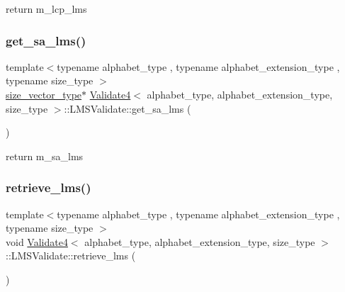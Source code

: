 return m\+\_\+lcp\+\_\+lms 

\mbox{\label{struct_validate4_1_1_l_m_s_validate_a31cdfa18f11ba39b3d9fbf08706913fc}} 
\subsubsection{\texorpdfstring{get\+\_\+sa\+\_\+lms()}{get\_sa\_lms()}}
{\footnotesize\ttfamily template$<$typename alphabet\+\_\+type , typename alphabet\+\_\+extension\+\_\+type , typename size\+\_\+type $>$ \\
\hyperlink{class_validate4_a46ea31a0a4b23f583806792160421d15}{size\+\_\+vector\+\_\+type}$\ast$ \hyperlink{class_validate4}{Validate4}$<$ alphabet\+\_\+type, alphabet\+\_\+extension\+\_\+type, size\+\_\+type $>$\+::L\+M\+S\+Validate\+::get\+\_\+sa\+\_\+lms (\begin{DoxyParamCaption}{ }\end{DoxyParamCaption})\hspace{0.3cm}{\ttfamily [inline]}}



return m\+\_\+sa\+\_\+lms 

\mbox{\label{struct_validate4_1_1_l_m_s_validate_afd7ee2100849c6c9bc493782d0c9aea3}} 
\subsubsection{\texorpdfstring{retrieve\+\_\+lms()}{retrieve\_lms()}}
{\footnotesize\ttfamily template$<$typename alphabet\+\_\+type , typename alphabet\+\_\+extension\+\_\+type , typename size\+\_\+type $>$ \\
void \hyperlink{class_validate4}{Validate4}$<$ alphabet\+\_\+type, alphabet\+\_\+extension\+\_\+type, size\+\_\+type $>$\+::L\+M\+S\+Validate\+::retrieve\+\_\+lms (\begin{DoxyParamCaption}{ }\end{DoxyParamCaption})\hspace{0.3cm}{\ttfamily [inline]}}



